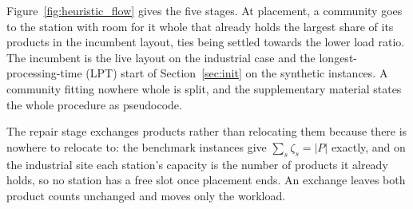 \documentclass[]{interact}
\begin{document}
Figure~\ref{fig:heuristic_flow} gives the five stages. At placement, a community goes to the station with room for it whole that already holds the largest share of its products in the incumbent layout, ties being settled towards the lower load ratio. The incumbent is the live layout on the industrial case and the longest-processing-time (LPT) start of Section~\ref{sec:init} on the synthetic instances. A community fitting nowhere whole is split, and the supplementary material states the whole procedure as pseudocode.

The repair stage exchanges products rather than relocating them because there is nowhere to relocate to: the benchmark instances give $\sum_s \zeta_s = |P|$ exactly, and on the industrial site each station's capacity is the number of products it already holds, so no station has a free slot once placement ends. An exchange leaves both product counts unchanged and moves only the workload.
\end{document}
